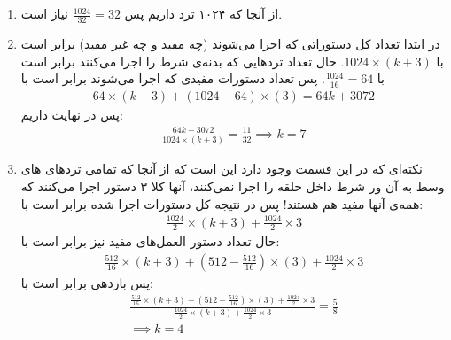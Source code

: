 \section{}
\begin{enumerate}
    \item از آنجا که ۱۰۲۴ ترد داریم پس $\frac{1024}{32} = 32$  نیاز است.
    \item در ابتدا تعداد کل دستوراتی که اجرا می‌شوند (چه مفید و چه غیر مفید) برابر است با
    $1024 \times (k + 3)$.
    حال تعداد ترد‌هایی که بدنه‌ی شرط را اجرا می‌کنند برابر است با
    $\frac{1024}{16} = 64$.
    پس تعداد دستورات مفیدی که اجرا می‌شوند برابر است با
    \begin{gather*}
        64 \times (k + 3) + (1024 - 64) \times (3) = 64k + 3072
    \end{gather*}
    پس در نهایت داریم:
    \begin{gather*}
        \frac{64k + 3072}{1024 \times (k + 3)} = \frac{11}{32} \implies k = 7
    \end{gather*}
    \item نکته‌ای که در این قسمت وجود دارد این است که از آنجا که تمامی ترد‌های
    های
    وسط به آن ور شرط داخل حلقه را اجرا نمی‌کنند،‌ آنها کلا ۳ دستور اجرا می‌کنند که همه‌ی آنها مفید هم هستند!
    پس در نتیجه کل دستورات اجرا شده برابر است با:
    \begin{gather*}
        \frac{1024}{2} \times (k + 3) + \frac{1024}{2} \times 3
    \end{gather*}
    حال تعداد دستور العمل‌های مفید نیز برابر است با:
    \begin{gather*}
        \frac{512}{16} \times (k + 3) + (512 - \frac{512}{16}) \times (3) + \frac{1024}{2} \times 3
    \end{gather*}
    پس بازدهی برابر است با:
    \begin{gather*}
        \frac{\frac{512}{16} \times (k + 3) + (512 - \frac{512}{16}) \times (3) + \frac{1024}{2} \times 3}{\frac{1024}{2} \times (k + 3) + \frac{1024}{2} \times 3} = \frac{5}{8}\\
        \implies k = 4
    \end{gather*}
\end{enumerate}